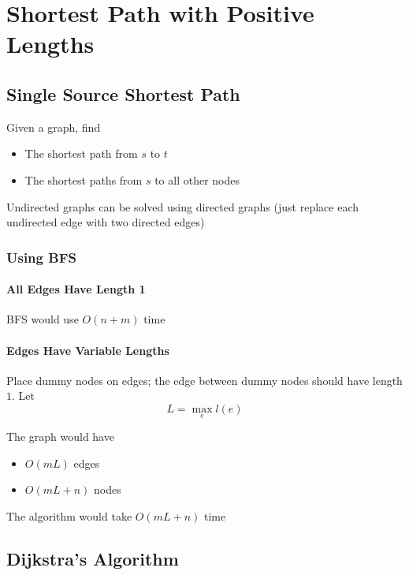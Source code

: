 \section{Shortest Path with Positive Lengths}

\subsection{Single Source Shortest Path}

  Given a graph, find

  \begin{itemize}
    \item The shortest path from $ s $ to $ t $
    \item The shortest paths from $ s $ to all other nodes
  \end{itemize}

  Undirected graphs can be solved using directed graphs (just replace each
  undirected edge with two directed edges)

  \subsubsection{Using BFS}

    \paragraph{All Edges Have Length 1} BFS would use $ O\left( n + m \right) $
    time

    \paragraph{Edges Have Variable Lengths} Place dummy nodes on edges; the
    edge between dummy nodes should have length $ 1 $. Let
    \begin{equation}
      L = \max_{e} l\left( e \right)
    \end{equation}

    The graph would have

    \begin{itemize}
      \item $ O\left( mL \right) $ edges
      \item $ O\left( mL + n \right) $ nodes
    \end{itemize}

    The algorithm would take $ O\left( mL + n \right) $ time

  \subsection{Dijkstra’s Algorithm}

